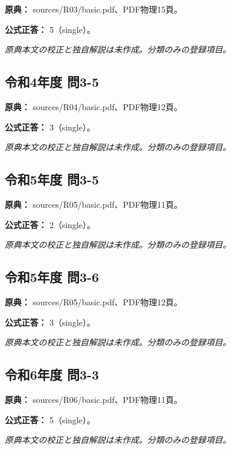 \noindent\textbf{原典：} sources/R03/basic.pdf、PDF物理15頁。

\textbf{公式正答：} 5（single）。

\par\textit{原典本文の校正と独自解説は未作成。分類のみの登録項目。}

\subsection{令和4年度 問3-5}
\label{q:r04-reg-basic-3-5}

\noindent\textbf{原典：} sources/R04/basic.pdf、PDF物理12頁。

\textbf{公式正答：} 3（single）。

\par\textit{原典本文の校正と独自解説は未作成。分類のみの登録項目。}

\subsection{令和5年度 問3-5}
\label{q:r05-reg-basic-3-5}

\noindent\textbf{原典：} sources/R05/basic.pdf、PDF物理11頁。

\textbf{公式正答：} 2（single）。

\par\textit{原典本文の校正と独自解説は未作成。分類のみの登録項目。}

\subsection{令和5年度 問3-6}
\label{q:r05-reg-basic-3-6}

\noindent\textbf{原典：} sources/R05/basic.pdf、PDF物理12頁。

\textbf{公式正答：} 3（single）。

\par\textit{原典本文の校正と独自解説は未作成。分類のみの登録項目。}

\subsection{令和6年度 問3-3}
\label{q:r06-reg-basic-3-3}

\noindent\textbf{原典：} sources/R06/basic.pdf、PDF物理11頁。

\textbf{公式正答：} 5（single）。

\par\textit{原典本文の校正と独自解説は未作成。分類のみの登録項目。}

